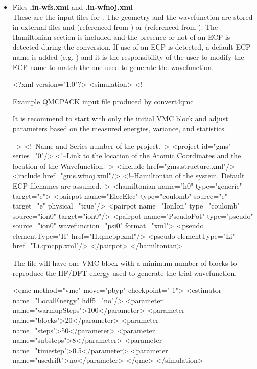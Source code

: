 \begin{itemize}
 \item Files \textbf{.in-wfs.xml} and \textbf{.in-wfnoj.xml} \\ These
   are the input files for \qmcpack.  The geometry and the
   wavefunction are stored in external files 
   and  (referenced from ) or
    (referenced from
   ). The Hamiltonian section is included
   and the presence or not of an ECP is detected during the
   conversion. If use of an ECP is detected, a default ECP name is
   added (e.g. ) and it is the responsibility of
   the user to modify the ECP name to match the one used to generate
   the wavefunction.\\
  \begin{shade}
  <?xml version="1.0"?>
<simulation>
  <!--
 
Example QMCPACK input file produced by convert4qmc
 
It is recommend to start with only the initial VMC block and adjust
parameters based on the measured energies, variance, and statistics.

-->
  <!--Name and Series number of the project.-->
  <project id="gms" series="0"/>
  <!--Link to the location of the Atomic Coordinates and the location of 
      the Wavefunction.-->
  <include href="gms.structure.xml"/>
  <include href="gms.wfnoj.xml"/>
  <!--Hamiltonian of the system. Default ECP filenames are assumed.-->
  <hamiltonian name="h0" type="generic" target="e">
    <pairpot name="ElecElec" type="coulomb" source="e" target="e" 
                                                   physical="true"/>
    <pairpot name="IonIon" type="coulomb" source="ion0" target="ion0"/>
    <pairpot name="PseudoPot" type="pseudo" source="ion0" wavefunction="psi0" 
                                                           format="xml">
      <pseudo elementType="H" href="H.qmcpp.xml"/>
      <pseudo elementType="Li" href="Li.qmcpp.xml"/>
    </pairpot>
  </hamiltonian>

 \end{shade}

 The  file will have one VMC block with a
 minimum number of blocks to reproduce the HF/DFT energy used to
 generate the trial wavefunction.
 
 \begin{shade}
  <qmc method="vmc" move="pbyp" checkpoint="-1">
    <estimator name="LocalEnergy" hdf5="no"/>
    <parameter name="warmupSteps">100</parameter>
    <parameter name="blocks">20</parameter>
    <parameter name="steps">50</parameter>
    <parameter name="substeps">8</parameter>
    <parameter name="timestep">0.5</parameter>
    <parameter name="usedrift">no</parameter>
  </qmc>
</simulation>
 \end{shade}


\end{itemize}
